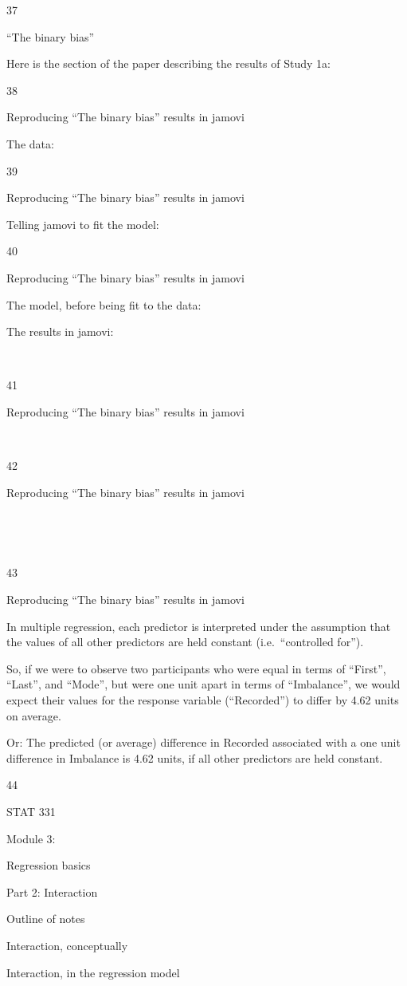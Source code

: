 \documentclass[
  letterpaper,
  DIV=11,
  numbers=noendperiod]{scrreprt}
\begin{document}
37

``The binary bias''

Here is the section of the paper describing the results of Study 1a:

38

Reproducing ``The binary bias'' results in jamovi

The data:

39

Reproducing ``The binary bias'' results in jamovi

Telling jamovi to fit the model:

40

Reproducing ``The binary bias'' results in jamovi

The model, before being fit to the data:

The results in jamovi:

~

41

Reproducing ``The binary bias'' results in jamovi

~

42

Reproducing ``The binary bias'' results in jamovi

~

~

43

Reproducing ``The binary bias'' results in jamovi

In multiple regression, each predictor is interpreted under the
assumption that the values of all other predictors are held constant
(i.e.~``controlled for'').

So, if we were to observe two participants who were equal in terms of
``First'', ``Last'', and ``Mode'', but were one unit apart in terms of
``Imbalance'', we would expect their values for the response variable
(``Recorded'') to differ by 4.62 units on average.

Or: The predicted (or average) difference in Recorded associated with a
one unit difference in Imbalance is 4.62 units, if all other predictors
are held constant.

44

STAT 331

Module 3:

Regression basics

Part 2: Interaction

Outline of notes

Interaction, conceptually

Interaction, in the regression model
\end{document}
